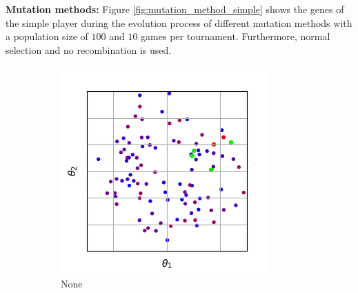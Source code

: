 \documentclass{llncs}
\begin{document}
\textbf{Mutation methods:} Figure \ref{fig:mutation_method_simple} shows the genes of the simple player during the evolution process of different mutation methods with a population size of $100$ and $10$ games per tournament. Furthermore, normal selection and no recombination is used.
\begin{figure}[t]
    \centering
    \begin{subfigure}[t]{0.24\textwidth}
        \centering
        \captionsetup{width=.9\textwidth}
        \includegraphics[width=\textwidth]{figures/mutation/simple_normal-100-10_0-1.png}
        \caption{None}
        \label{subfig:mutation_none_01}
    \end{subfigure}
    \begin{subfigure}[t]{0.24\textwidth}
        \centering
        \captionsetup{width=.9\textwidth}

\end{subfigure}
\end{figure}
\end{document}
